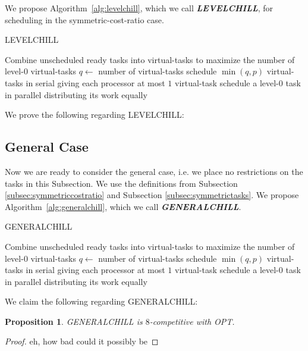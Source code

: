 \documentclass[twocolumn]{article}[11pt]
\newcommand{\defn}[1]{{\textit{\textbf{\boldmath #1}}}\xspace}
\newtheorem{proposition}{Proposition}
\begin{document}
We propose Algorithm~\ref{alg:levelchill}, which we call \defn{LEVELCHILL},
for scheduling in the symmetric-cost-ratio case.

\begin{algorithm}
  \caption{LEVELCHILL}
  \label{alg:levelchill}
  \begin{algorithmic}
        \State Combine unscheduled ready tasks into virtual-tasks
        to maximize the number of level-$0$ virtual-tasks
        \State $q \gets $ number of virtual-tasks 
          \State schedule $\min(q, p)$ virtual-tasks in serial
          \State giving each processor at most $1$ virtual-task
        \Else
          \State schedule a level-$0$ task in parallel
          \State distributing its work equally 
        \EndIf
      \EndIf
    \EndWhile
  \end{algorithmic}
\end{algorithm}

We prove the following regarding LEVELCHILL:


\subsection{General Case}
Now we are ready to consider the general case, i.e. we place no
restrictions on the tasks in this Subsection.
We use the definitions from Subsection
\ref{subsec:symmetriccostratio} and Subsection
\ref{subsec:symmetrictasks}.
We propose Algorithm~\ref{alg:generalchill}, which we call
\defn{GENERALCHILL}.

\begin{algorithm}
  \caption{GENERALCHILL}
  \label{alg:generalchill}
  \begin{algorithmic}
        \State Combine unscheduled ready tasks into virtual-tasks
        to maximize the number of level-$0$ virtual-tasks
        \State $q \gets $ number of virtual-tasks 
          \State schedule $\min(q, p)$ virtual-tasks in serial
          \State giving each processor at most $1$ virtual-task
        \Else
          \State schedule a level-$0$ task in parallel
          \State distributing its work equally 
        \EndIf
      \EndIf
    \EndWhile
  \end{algorithmic}
\end{algorithm}

We claim the following regarding GENERALCHILL:
\begin{proposition}
  GENERALCHILL is $8$-competitive with OPT.
\end{proposition}
\begin{proof}
  eh, how bad could it possibly be
\end{proof}
\end{document}
